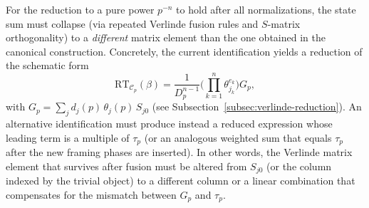 For the reduction to a pure power \(p^{-n}\) to hold after all normalizations, the state sum must collapse (via repeated Verlinde fusion rules and \(S\)-matrix orthogonality) to a \emph{different} matrix element than the one obtained in the canonical construction. Concretely, the current identification yields a reduction of the schematic form
\[
\mathrm{RT}_{\mathcal{C}_p}(\beta) = \frac{1}{D_p^{n-1}} \Biggl( \prod_{k=1}^n \theta_{j_k}^{e_k} \Biggr) G_p,
\]
with \(G_p = \sum_j d_j(p)\,\theta_j(p)\,S_{j0}\) (see Subsection~\ref{subsec:verlinde-reduction}). An alternative identification must produce instead a reduced expression whose leading term is a multiple of \(\tau_p\) (or an analogous weighted sum that equals \(\tau_p\) after the new framing phases are inserted). In other words, the Verlinde matrix element that survives after fusion must be altered from \(S_{j0}\) (or the column indexed by the trivial object) to a different column or a linear combination that compensates for the mismatch between \(G_p\) and \(\tau_p\).

